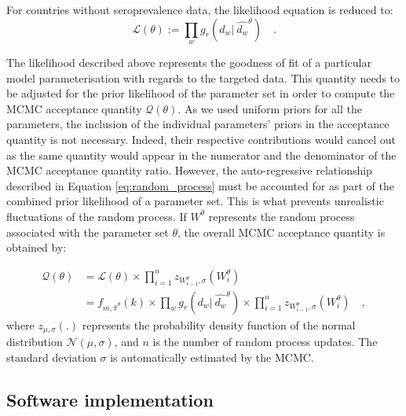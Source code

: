 For countries without seroprevalence data, the likelihood equation is reduced to:
\begin{equation}
    \label{eq:likelihood}
    \mathcal{L}(\theta) := \prod_w g_r(d_w | \:\hat{d_w}^\theta) \quad.
\end{equation}

The likelihood described above represents the goodness of fit of a particular model parameterisation with regards to the targeted data. 
This quantity needs to be adjusted for the prior likelihood of the parameter set in order to compute the MCMC acceptance quantity $\mathcal{Q}(\theta)$.
As we used uniform priors for all the parameters, the inclusion of the individual parameters' priors in the acceptance quantity is not necessary. 
Indeed, their respective contributions would cancel out as the same quantity would appear in the numerator and the denominator of the 
MCMC acceptance quantity ratio. However, the auto-regressive relationship described in Equation \ref{eq:random_process}
must be accounted for as part of the combined prior likelihood of a parameter set. This is what prevents unrealistic fluctuations of the random process.
If $W^\theta$ represents the random process associated with the parameter set $\theta$, the overall MCMC acceptance quantity is obtained by:

\begin{equation}
    \label{eq:acc_qtt}
    \begin{split}
    \mathcal{Q}(\theta) & = \mathcal{L}(\theta) \times \prod_{i=1}^{n} z_{W^\theta_{i-1},\sigma}(W^\theta_i) \\
                        & = f_{m,\hat{\pi}^\theta}(k) \times \prod_w g_r(d_w | \:\hat{d_w}^\theta) \times \prod_{i=1}^{n} z_{W^\theta_{i-1},\sigma}(W^\theta_i) \quad ,
    \end{split}
\end{equation}
where $z_{\mu,\sigma}(.)$ represents the probability density function of the normal distribution $\mathcal{N}(\mu, \sigma)$, and $n$ is the number 
of random process updates. The standard deviation $\sigma$ is automatically estimated by the MCMC.

\subsection{Software implementation}

